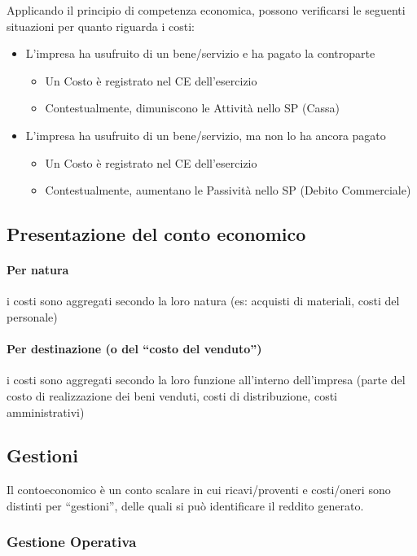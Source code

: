 \documentclass[10pt,a4paper,fleqn,oneside]{book}
\begin{document}
Applicando il principio di competenza economica, possono verificarsi le
seguenti situazioni per quanto riguarda i costi:
\begin{itemize}
    \item L’impresa ha usufruito di un bene/servizio e ha pagato la controparte
    \begin{itemize}
        \item Un Costo è registrato nel CE dell’esercizio
        \item Contestualmente, dimuniscono le Attività nello SP (Cassa)
    \end{itemize}
    \item L’impresa ha usufruito di un bene/servizio, ma non lo ha ancora pagato
    \begin{itemize}
        \item Un Costo è registrato nel CE dell’esercizio
        \item Contestualmente, aumentano le Passività nello SP (Debito Commerciale)
    \end{itemize}
\end{itemize}

\subsection{Presentazione del conto economico}

\paragraph{Per natura}
i costi sono aggregati secondo la loro natura (es: acquisti di
materiali, costi del personale)

\paragraph{Per destinazione (o del ``costo del venduto'')}
i costi sono aggregati secondo la loro funzione all’interno dell’impresa (parte del costo di
realizzazione dei beni venduti, costi di distribuzione, costi amministrativi)

\subsection{Gestioni}
Il \gls{contoeconomico} è un conto scalare in cui ricavi/proventi e costi/oneri sono distinti per ``gestioni'',
delle quali si può identificare il reddito generato.

\subsubsection{Gestione Operativa}
\end{document}

